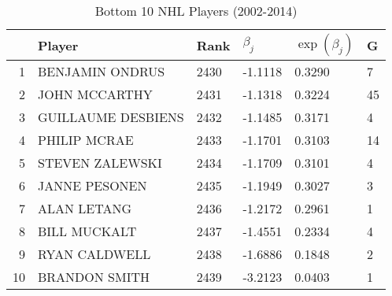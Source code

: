 \begin{table}[ht]
\centering
\begin{tabular}{rlllll}
  \hline
 & Player & Rank & $\beta_j$ & $\exp(\beta_j)$ & G \\ 
  \hline
1 & BENJAMIN ONDRUS & 2430 & -1.1118 & 0.3290 & 7 \\ 
  2 & JOHN MCCARTHY & 2431 & -1.1318 & 0.3224 & 45 \\ 
  3 & GUILLAUME DESBIENS & 2432 & -1.1485 & 0.3171 & 4 \\ 
  4 & PHILIP MCRAE & 2433 & -1.1701 & 0.3103 & 14 \\ 
  5 & STEVEN ZALEWSKI & 2434 & -1.1709 & 0.3101 & 4 \\ 
  6 & JANNE PESONEN & 2435 & -1.1949 & 0.3027 & 3 \\ 
  7 & ALAN LETANG & 2436 & -1.2172 & 0.2961 & 1 \\ 
  8 & BILL MUCKALT & 2437 & -1.4551 & 0.2334 & 4 \\ 
  9 & RYAN CALDWELL & 2438 & -1.6886 & 0.1848 & 2 \\ 
  10 & BRANDON SMITH & 2439 & -3.2123 & 0.0403 & 1 \\ 
   \hline
\end{tabular}
\caption{Bottom 10 NHL Players (2002-2014)} 
\label{tab:worst10}
\end{table}
